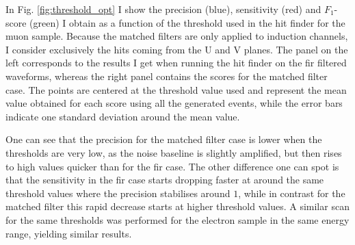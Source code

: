 In Fig. \ref{fig:threshold_opt} I show the precision (blue), sensitivity (red) and $F_{1}$-score (green) I obtain as a function of the threshold used in the hit finder for the muon sample. Because the matched filters are only applied to induction channels, I consider exclusively the hits coming from the U and V planes. The panel on the left corresponds to the results I get when running the hit finder on the \gls{fir} filtered waveforms, whereas the right panel contains the scores for the matched filter case. The points are centered at the threshold value used and represent the mean value obtained for each score using all the generated events, while the error bars indicate one standard deviation around the mean value.

One can see that the precision for the matched filter case is lower when the thresholds are very low, as the noise baseline is slightly amplified, but then rises to high values quicker than for the \gls{fir} case. The other difference one can spot is that the sensitivity in the \gls{fir} case starts dropping faster at around the same threshold values where the precision stabilises around $1$, while in contrast for the matched filter this rapid decrease starts at higher threshold values. A similar scan for the same thresholds was performed for the electron sample in the same energy range, yielding similar results.

